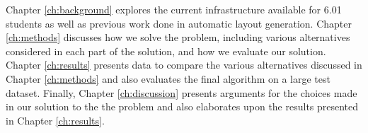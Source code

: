 Chapter \ref{ch:background} explores the current infrastructure available for
6.01 students as well as previous work done in automatic layout generation.
Chapter \ref{ch:methods} discusses how we solve the problem, including various
alternatives considered in each part of the solution, and how we evaluate
our solution. Chapter \ref{ch:results} presents data to compare the various
alternatives discussed in Chapter \ref{ch:methods} and also evaluates the final
algorithm on a large test dataset. Finally, Chapter \ref{ch:discussion}
presents arguments for the choices made in our solution to the the problem and
also elaborates upon the results presented in Chapter \ref{ch:results}.

%

